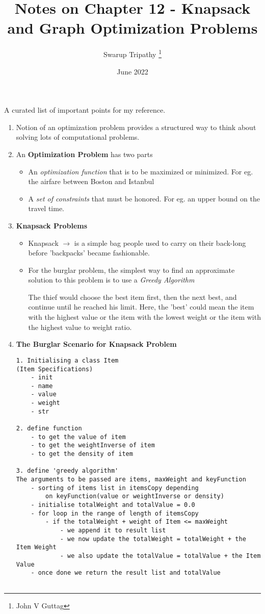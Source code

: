 \documentclass[11pt]{article}
\title{Notes on Chapter 12 - Knapsack and Graph Optimization Problems}
\author{Swarup Tripathy \thanks{John V Guttag}}
\date{June 2022}
\begin{document}
    \maketitle
    A curated list of important points for my reference.\\
    \begin{enumerate}
        \item Notion of an optimization problem provides a structured way to think about solving lots of computational problems.
        \item An \textbf{Optimization Problem} has two parts
        \begin{itemize}
            \item An \textit{optimization function} that is to be maximized or minimized. For eg. the airfare between Boston and Istanbul
            \item A \textit{set of constraints} that must be honored. For eg. an upper bound on the travel time.
        \end{itemize}
        \item \textbf{Knapsack Problems}
        \begin{itemize}
            \item Knapsack $\rightarrow$ is a simple bag people used to carry on their back-long before 'backpacks' became fashionable.
            \item For the burglar problem, the simplest way to find an approximate solution to this problem is to use a \textit{Greedy Algorithm}
            
            The thief would choose the best item first, then the next best, and continue until he reached his limit. Here, the 'best' could mean the item with the highest value or the item with the lowest weight or the item with the highest value to weight ratio.

        \end{itemize}
        \item \textbf{The Burglar Scenario for Knapsack Problem}
        \begin{verbatim}
1. Initialising a class Item
(Item Specifications)
    - init
    - name
    - value
    - weight
    - str

2. define function
    - to get the value of item
    - to get the weightInverse of item
    - to get the density of item

3. define 'greedy algorithm'
The arguments to be passed are items, maxWeight and keyFunction
    - sorting of items list in itemsCopy depending 
        on keyFunction(value or weightInverse or density)
    - initialise totalWeight and totalValue = 0.0
    - for loop in the range of length of itemsCopy
        - if the totalWeight + weight of Item <= maxWeight
            - we append it to result list
            - we now update the totalWeight = totalWeight + the Item Weight
            - we also update the totalValue = totalValue + the Item Value
    - once done we return the result list and totalValue


\end{verbatim}
\end{enumerate}
\end{document}
